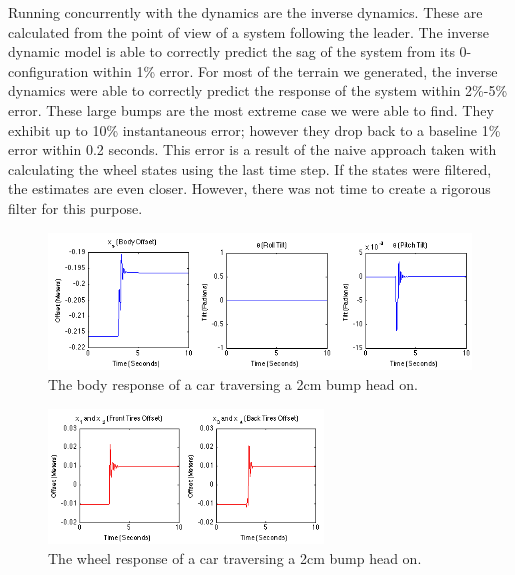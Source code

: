 Running concurrently with the dynamics are the inverse dynamics. These are calculated from the point of view of a system following the leader. The inverse dynamic model is able to correctly predict the sag of the system from its 0-configuration within 1\% error. For most of the terrain we generated, the inverse dynamics were able to correctly predict the response of the system within 2\%-5\% error. These large bumps are the most extreme case we were able to find. They exhibit up to 10\% instantaneous error; however they drop back to a baseline 1\% error within 0.2 seconds. This error is a result of the naive approach taken with calculating the wheel states using the last time step. If the states were filtered, the estimates are even closer. However, there was not time to create a rigorous filter for this purpose.

\begin{figure}[t]
	\centering
	\includegraphics[width=1.0\textwidth]{figures/results_2cm_body.png}
	\caption{The body response of a car traversing a 2cm bump head on.}
	\label{fig:fullcar_2cm_body}
\end{figure}

\begin{figure}[t]
	\centering
	\includegraphics[width=0.65\textwidth]{figures/results_2cm_wheel.png}
	\caption{The wheel response of a car traversing a 2cm bump head on.}
	\label{fig:fullcar_2cm_wheel}
\end{figure}

